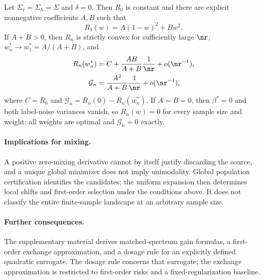 \begin{theorem}\label{thm:flatR1}
Let $\Sigma_r=\Sigma_h=\Sigma$ and $\delta=0$. Then $R_0$ is constant and there are explicit nonnegative coefficients $A,B$ such that
\begin{equation}
 R_1(w)=A(1-w)^2+Bw^2.
 \label{eq:flat-r1}
\end{equation}
If $A+B>0$, then $R_n$ is strictly convex for sufficiently large $\nr$, $w_n^*\to w_1^*=A/(A+B)$, and
\begin{align}
 R_n(w_n^*)&=C+\frac{AB}{A+B}\frac1\nr+o(\nr^{-1}),\notag\\
 \mathcal G_n&=\frac{A^2}{A+B}\frac1\nr+o(\nr^{-1}),
 \label{eq:flat-r1-optimum}
\end{align}
where $C=R_0$ and $\mathcal G_n=R_n(0)-R_n(w_n^*)$. If $A=B=0$, then $\beta^*=0$ and both label-noise variances vanish, so $R_n(w)=0$ for every sample size and weight: all weights are optimal and $\mathcal G_n=0$ exactly.
\end{theorem}

\paragraph{Implications for mixing.}
A positive zero-mixing derivative cannot by itself justify discarding the source, and a unique global minimizer does not imply unimodality. Global population certification identifies the candidates; the uniform expansion then determines local shifts and first-order selection under the conditions above. It does not classify the entire finite-sample landscape at an arbitrary sample size.

\paragraph{Further consequences.}
The supplementary material derives matched-spectrum gain formulas, a first-order exchange approximation, and a dosage rule for an explicitly defined quadratic surrogate. The dosage rule concerns that surrogate; the exchange approximation is restricted to first-order risks and a fixed-regularization baseline.
